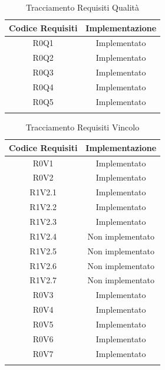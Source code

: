 \begin{longtable}{|c|c|}
	\hline
	\textbf{Codice Requisiti} & \textbf{Implementazione} \\
	\hline
	\endhead
	R0Q1 & Implementato\\
	\hline
	R0Q2 & Implementato\\
	\hline
	R0Q3 & Implementato\\
	\hline
	R0Q4 & Implementato\\
	\hline
	R0Q5 & Implementato\\
	\hline
	\caption[Tracciamento Requisiti Qualità]{Tracciamento Requisiti Qualità}
\end{longtable}

\begin{longtable}{|c|c|}
	\hline
	\textbf{Codice Requisiti} & \textbf{Implementazione} \\
	\hline
	\endhead
	R0V1 & Implementato\\
	\hline
	R0V2 & Implementato\\
	\hline
	R1V2.1 & Implementato\\
	\hline
	R1V2.2 & Implementato\\
	\hline
	R1V2.3 & Implementato\\
	\hline
	R1V2.4 & Non implementato\\
	\hline
	R1V2.5 & Non implementato\\
	\hline
	R1V2.6 & Non implementato\\
	\hline
	R1V2.7 & Non implementato\\
	\hline
	R0V3 & Implementato\\
	\hline
	R0V4 & Implementato\\
	\hline
	R0V5 & Implementato\\
	\hline
	R0V6 & Implementato\\
	\hline
	R0V7 & Implementato\\
	\hline
	\caption[Tracciamento Requisiti Vincolo]{Tracciamento Requisiti Vincolo}
\end{longtable}

